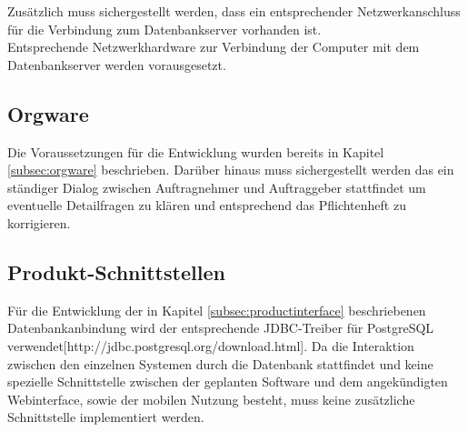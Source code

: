 Zusätzlich muss sichergestellt werden, dass ein entsprechender Netzwerkanschluss für die Verbindung zum Datenbankserver vorhanden ist.\\

Entsprechende Netzwerkhardware zur Verbindung der Computer mit dem Datenbankserver werden vorausgesetzt.\\

\subsection{Orgware}
\label{subsec:devorgware}

Die Voraussetzungen für die Entwicklung wurden bereits in Kapitel \ref{subsec:orgware} beschrieben.
Darüber hinaus muss sichergestellt werden das ein ständiger Dialog zwischen Auftragnehmer und Auftraggeber stattfindet um eventuelle Detailfragen zu klären und entsprechend das Pflichtenheft zu korrigieren.

\subsection{Produkt-Schnittstellen}

Für die Entwicklung der in Kapitel \ref{subsec:productinterface} beschriebenen Datenbankanbindung wird der entsprechende JDBC-Treiber für PostgreSQL verwendet[http://jdbc.postgresql.org/download.html].
Da die Interaktion zwischen den einzelnen Systemen durch die Datenbank stattfindet und keine spezielle Schnittstelle zwischen der geplanten Software und dem angekündigten Webinterface, sowie der mobilen Nutzung besteht, muss keine zusätzliche Schnittstelle implementiert werden.